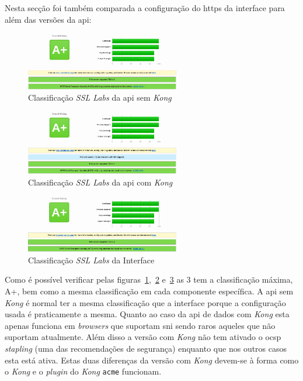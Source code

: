 Nesta secção foi também comparada a configuração do \acrshort{https} da interface para além das versões da \acrshort{api}:
\begin{figure}[H]
    \centering
    \includegraphics[width=0.6\textwidth]{img/sslLabsAPISemKong.png}
    \caption{Classificação \textit{SSL Labs} da \acrshort{api} sem \textit{Kong}\label{fig:sslLabsAPISemKong}}
\end{figure}
\begin{figure}[H]
    \centering
    \includegraphics[width=0.6\textwidth]{img/sslLabsAPIComKong.png}
    \caption{Classificação \textit{SSL Labs} da \acrshort{api} com \textit{Kong}\label{fig:sslLabsAPIComKong}}
\end{figure}
\begin{figure}[H]
    \centering
    \includegraphics[width=0.6\textwidth]{img/sslLabsInterface.png}
    \caption{Classificação \textit{SSL Labs} da Interface\label{fig:sslLabsInterface}}
\end{figure}

Como é possível verificar pelas figuras~\ref{fig:sslLabsAPISemKong},~\ref{fig:sslLabsAPIComKong} e~\ref{fig:sslLabsInterface} as 3 tem a classificação máxima, A+, bem como a mesma classificação em cada componente específica. A \acrshort{api} sem \textit{Kong} é normal ter a mesma classificação que a interface porque a configuração usada é praticamente a mesma. Quanto ao caso da \acrshort{api} de dados com \textit{Kong} esta apenas funciona em \textit{browsers} que suportam \acrshort{sni} sendo raros aqueles que não suportam atualmente. Além disso a versão com \textit{Kong} não tem ativado o \acrshort{ocsp} \textit{stapling} (uma das recomendações de segurança) enquanto que nos outros casos esta está ativa. Estas duas diferenças da versão com \textit{Kong} devem-se à forma como o \textit{Kong} e o \textit{plugin} do \textit{Kong} \texttt{acme} funcionam.

